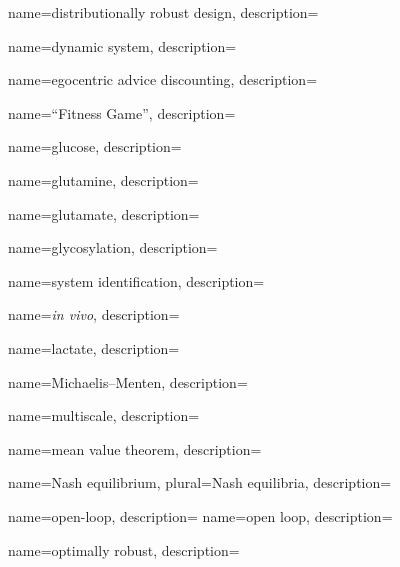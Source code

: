 	{
		name={distributionally robust design},
		description={}
	}
	
	{
		name={dynamic system},
		description={}
	}		


	{
		name={egocentric advice discounting},
		description={}
	}


	{
		name={``Fitness Game''},
		description={}
	}


	{
		name={glucose},
		description={}
	}
	
	{
		name={glutamine},
		description={}
	}	
	
	{
		name={glutamate},
		description={}
	}		


	{
		name={glycosylation},
		description={}
	}	
	

	{
		name={system identification},
		description={}
	}

	{
		name={{\it in vivo}},		
		description={}
	}
	

	{
		name={lactate},
		description={}
	}	
	

	{
		name={Michaelis--Menten},
		description={}
	}		


	{
		name={multiscale},
		description={}
	}		


	{
		name={mean value theorem},
		description={}
	}		
	

	{
		name={Nash equilibrium},
		plural={Nash equilibria},
		description={}
	}
	

	{
		name={open-loop},
		description={}
	}
	{
		name={open loop},
		description={}
	}	

	{
		name={optimally robust},
		description={}
	}
	
